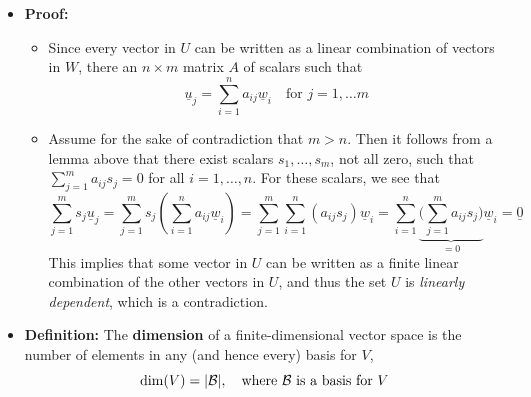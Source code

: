 \documentclass[11pt,twoside]{report}
\newcommand{\vecnot}{\underline}
\newcommand{\Span}{\mathrm{span}}
\begin{document}
\begin{itemize}

\item \textbf{Proof:} 

\begin{itemize}
\item Since every vector in $U$ can be written as a linear combination of vectors in $W$, there an $n \times m$ matrix $A$  of scalars such that 
\[
\vecnot{u}_j = \sum_{i=1}^n a_{ij} \vecnot{w}_i \quad \text{for $j = 1, \dots m$} 
\]
\item  Assume for the sake of contradiction that $m > n$. Then it follows from a lemma above that  there exist scalars $s_1, \dots, s_m$,  not all zero,  such that $\sum_{j=1}^m   a_{ij}  s_j  = 0$ for all $i = 1, \dots, n$.  For these scalars, we see that
\[
\sum_{j=1}^m s_j \vecnot{u}_j = \sum_{j=1}^m  s_j  \left(  \sum_{i=1}^n  a_{ij} \vecnot{w}_i \right) = \sum_{j=1}^m    \sum_{i=1}^n  ( a_{ij}  s_j)   \vecnot{w}_i  =\sum_{i=1}^n  \underbrace{ \bigg(  \sum_{j=1}^m   a_{ij}  s_j  \bigg) }_{ = 0} \vecnot{w}_i   = \vecnot{0} 
\]
 This implies that some vector in $U$ can be written as a finite linear combination of the other vectors in $U$, and thus the set $U$ is \emph{linearly dependent}, which is a contradiction. 

\end{itemize}






\item \textbf{Definition:} The \textbf{dimension} of a finite-dimensional vector space is the number of elements in any (and hence every) basis for $V$,
\[
\dim(V) = |\mathcal{B}|, \quad \text{where $\mathcal{B}$ is a basis for $V$}
\]






\end{itemize}
\end{document}
